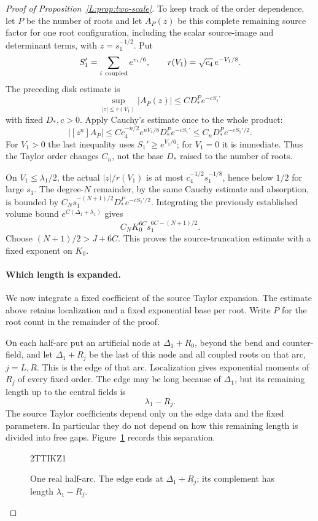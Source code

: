\documentclass[11pt]{article}
\numberwithin{equation}{section}
\theoremstyle{definition}\newtheorem{definition}[theorem]{Definition}
\theoremstyle{remark}\newtheorem{remark}[theorem]{Remark}
\begin{document}
\begin{proof}[Proof of Proposition~\ref{L:prop:two-scale}]
To keep track of the order dependence, let $P$ be the number of roots and let $A_P(z)$ be this complete
remaining source factor for one root configuration, including the scalar
source-image and determinant terms, with $z=s_1^{-1/2}$. Put
\[
 S_1'=\sum_{i\ {\rm coupled}}e^{v_i/6},\qquad
 r(V_1)=\sqrt{c_4}\,e^{-V_1/8}.
\]
The preceding disk estimate is
\[
 \sup_{|z|\le r(V_1)}|A_P(z)|\le C D_*^P e^{-cS_1'}
\]
with fixed $D_*,c>0$. Apply Cauchy's estimate once to the whole product:
\[
 |[z^n]A_P|\le Cc_4^{-n/2}e^{nV_1/8}D_*^P e^{-cS_1'}
              \le C_nD_*^P e^{-cS_1'/2}.
\]
For $V_1>0$ the last inequality uses $S_1'\ge e^{V_1/6}$; for $V_1=0$
it is immediate. Thus the Taylor order changes $C_n$, not the base
$D_*$ raised to the number of roots.

On $V_1\le\lambda_1/2$, the actual $|z|/r(V_1)$ is at most
$c_4^{-1/2}s_1^{-1/8}$, hence below $1/2$ for large $s_1$.
The degree-$N$ remainder, by the same Cauchy estimate and absorption,
is bounded by $C_Ns_1^{-(N+1)/2}D_*^Pe^{-cS_1'/2}$.
Integrating the previously established volume bound
$e^{C(\Delta_1+\lambda_1)}$ gives
\[
 C_NK_0^{6C}s_1^{6C-(N+1)/2}.
\]
Choose $(N+1)/2>J+6C$. This proves the source-truncation estimate
with a fixed exponent on $K_0$.

\paragraph{Which length is expanded.}
We now integrate a fixed coefficient of the source Taylor expansion.
The estimate above retains localization and a fixed exponential base
per root. Write $P$ for the root count in the remainder of the proof.

On each half-arc put an artificial node at $\Delta_1+R_0$, beyond the
bend and counter-field, and let $\Delta_1+R_j$ be the last of this node
and all coupled roots on that arc, $j=L,R$. This is the edge of that
arc. Localization gives exponential moments of $R_j$ of every fixed
order. The edge may be long because of $\Delta_1$, but its remaining
length up to the central fields is
\[
             \lambda_1-R_j.
\]
The source Taylor coefficients depend only on the edge data and the
fixed parameters. In particular they do not depend on how this
remaining length is divided into free gaps. Figure~\ref{L:fig:two-scale} records this separation.
\begin{figure}[htbp]
\centeringZQT2TTIKZ1

\caption{One real half-arc. The edge ends at $\Delta_1+R_j$;
its complement has length $\lambda_1-R_j$.}
\label{L:fig:two-scale}
\end{figure}


\end{proof}
\end{document}
